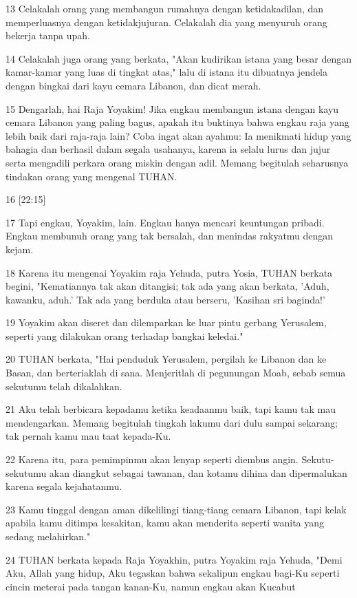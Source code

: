 \par 13 Celakalah orang yang membangun rumahnya dengan ketidakadilan, dan memperluasnya dengan ketidakjujuran. Celakalah dia yang menyuruh orang bekerja tanpa upah.
\par 14 Celakalah juga orang yang berkata, "Akan kudirikan istana yang besar dengan kamar-kamar yang luas di tingkat atas," lalu di istana itu dibuatnya jendela dengan bingkai dari kayu cemara Libanon, dan dicat merah.
\par 15 Dengarlah, hai Raja Yoyakim! Jika engkau membangun istana dengan kayu cemara Libanon yang paling bagus, apakah itu buktinya bahwa engkau raja yang lebih baik dari raja-raja lain? Coba ingat akan ayahmu: Ia menikmati hidup yang bahagia dan berhasil dalam segala usahanya, karena ia selalu lurus dan jujur serta mengadili perkara orang miskin dengan adil. Memang begitulah seharusnya tindakan orang yang mengenal TUHAN.
\par 16 [22:15]
\par 17 Tapi engkau, Yoyakim, lain. Engkau hanya mencari keuntungan pribadi. Engkau membunuh orang yang tak bersalah, dan menindas rakyatmu dengan kejam.
\par 18 Karena itu mengenai Yoyakim raja Yehuda, putra Yosia, TUHAN berkata begini, "Kematiannya tak akan ditangisi; tak ada yang akan berkata, 'Aduh, kawanku, aduh.' Tak ada yang berduka atau berseru, 'Kasihan sri baginda!'
\par 19 Yoyakim akan diseret dan dilemparkan ke luar pintu gerbang Yerusalem, seperti yang dilakukan orang terhadap bangkai keledai."
\par 20 TUHAN berkata, "Hai penduduk Yerusalem, pergilah ke Libanon dan ke Basan, dan berteriaklah di sana. Menjeritlah di pegunungan Moab, sebab semua sekutumu telah dikalahkan.
\par 21 Aku telah berbicara kepadamu ketika keadaanmu baik, tapi kamu tak mau mendengarkan. Memang begitulah tingkah lakumu dari dulu sampai sekarang; tak pernah kamu mau taat kepada-Ku.
\par 22 Karena itu, para pemimpinmu akan lenyap seperti diembus angin. Sekutu-sekutumu akan diangkut sebagai tawanan, dan kotamu dihina dan dipermalukan karena segala kejahatanmu.
\par 23 Kamu tinggal dengan aman dikelilingi tiang-tiang cemara Libanon, tapi kelak apabila kamu ditimpa kesakitan, kamu akan menderita seperti wanita yang sedang melahirkan."
\par 24 TUHAN berkata kepada Raja Yoyakhin, putra Yoyakim raja Yehuda, "Demi Aku, Allah yang hidup, Aku tegaskan bahwa sekalipun engkau bagi-Ku seperti cincin meterai pada tangan kanan-Ku, namun engkau akan Kucabut

